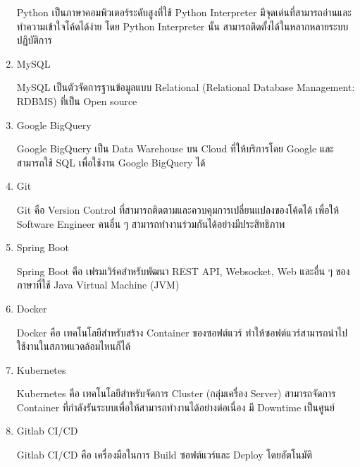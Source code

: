 \begin{enumerate}
	Python เป็นภาษาคอมพิวเตอร์ระดับสูงที่ใช้ Python Interpreter มีจุดเด่นที่สามารถอ่านและทำความเข้าใจโค้ดได้ง่าย โดย Python Interpreter นั้น สามารถติดตั้งได้ในหลากหลายระบบปฏิบัติการ  ~\cite{python}	
	\item MySQL
	
	MySQL เป็นตัวจัดการฐานข้อมูลแบบ Relational (Relational Database Management: RDBMS) ที่เป็น Open source ~\cite{mysql}
	\item Google BigQuery
	
	Google BigQuery เป็น Data Warehouse บน Cloud ที่ให้บริการโดย Google และสามารถใช้ SQL เพื่อใช้งาน Google BigQuery ได้ ~\cite{bigquery}
	\item Git
	
	Git คือ Version Control ที่สามารถติดตามและควบคุมการเปลี่ยนแปลงของโค้ดได้ เพื่อให้ Software Engineer คนอื่น ๆ สามารถทำงานร่วมกันได้อย่างมีประสิทธิภาพ ~\cite{git}
	\item Spring Boot
	
	Spring Boot คือ เฟรมเวิร์คสำหรับพัฒนา REST API, Websocket, Web และอื่น ๆ ของภาษาที่ใช้ Java Virtual Machine (JVM) ~\cite{spring}
	\item Docker
	
	Docker คือ เทคโนโลยีสำหรับสร้าง Container ของซอฟต์แวร์ ทำให้ซอฟต์แวร์สามารถนำไปใช้งานในสภาพแวดล้อมไหนก็ได้ ~\cite{docker}
	\item Kubernetes

	Kubernetes คือ เทคโนโลยีสำหรับจัดการ Cluster (กลุ่มเครื่อง Server) สามารถจัดการ Container ที่กำลังรันระบบเพื่อให้สามารถทำงานได้อย่างต่อเนื่อง มี Downtime เป็นศูนย์ ~\cite{kubernetes}
	\item Gitlab CI/CD
	
	Gitlab CI/CD คือ เครื่องมือในการ Build ซอฟต์แวร์และ Deploy โดยอัตโนมัติ ~\cite{gitlabcicd}
\end{enumerate}

